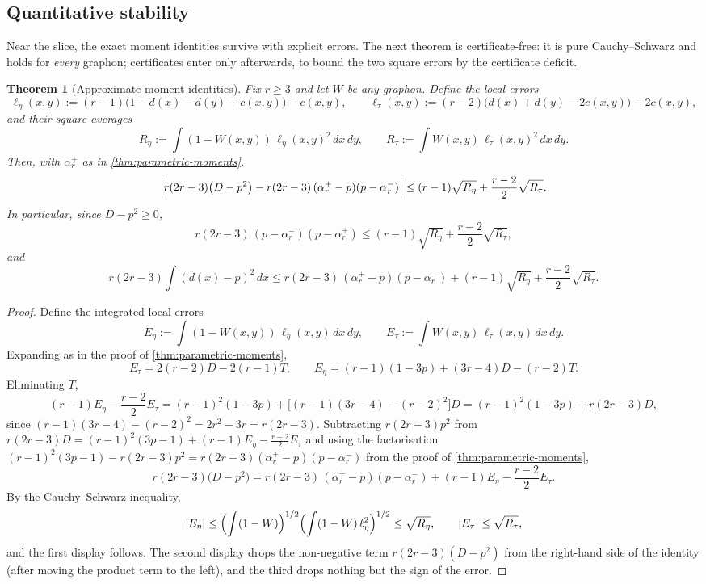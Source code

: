 \documentclass[11pt]{article}
\newtheorem{theorem}{Theorem}
\theoremstyle{definition}
\begin{document}
\subsection{Quantitative stability}

Near the slice, the exact moment identities survive with explicit errors.  The next
theorem is certificate-free: it is pure Cauchy--Schwarz and holds for \emph{every}
graphon; certificates enter only afterwards, to bound the two square errors by the
certificate deficit.

\begin{theorem}[Approximate moment identities]\label{thm:approximate-moments}
Fix $r\ge3$ and let $W$ be any graphon.  Define the local errors
\[
  \ell_\eta(x,y):=(r-1)\bigl(1-d(x)-d(y)+c(x,y)\bigr)-c(x,y),
  \qquad
  \ell_\tau(x,y):=(r-2)\bigl(d(x)+d(y)-2c(x,y)\bigr)-2c(x,y),
\]
and their square averages
\[
  R_\eta:=\int(1-W(x,y))\,\ell_\eta(x,y)^2\,dx\,dy,
  \qquad
  R_\tau:=\int W(x,y)\,\ell_\tau(x,y)^2\,dx\,dy .
\]
Then, with $\alpha_r^\pm$ as in \cref{thm:parametric-moments},
\[
  \Bigl|
  r(2r-3)\bigl(D-p^2\bigr)
  -
  r(2r-3)\,(\alpha_r^+-p)(p-\alpha_r^-)
  \Bigr|
  \le
  (r-1)\sqrt{R_\eta}+\frac{r-2}{2}\sqrt{R_\tau}.
\]
In particular, since $D-p^2\ge0$,
\[
  r(2r-3)\,(p-\alpha_r^-)(p-\alpha_r^+)
  \le
  (r-1)\sqrt{R_\eta}+\frac{r-2}{2}\sqrt{R_\tau},
\]
and
\[
  r(2r-3)\int(d(x)-p)^2\,dx
  \le
  r(2r-3)\,(\alpha_r^+-p)(p-\alpha_r^-)
  +
  (r-1)\sqrt{R_\eta}+\frac{r-2}{2}\sqrt{R_\tau}.
\]
\end{theorem}

\begin{proof}
Define the integrated local errors
\[
  E_\eta:=\int(1-W(x,y))\,\ell_\eta(x,y)\,dx\,dy,
  \qquad
  E_\tau:=\int W(x,y)\,\ell_\tau(x,y)\,dx\,dy .
\]
Expanding as in the proof of \cref{thm:parametric-moments},
\[
  E_\tau=2(r-2)D-2(r-1)T,
  \qquad
  E_\eta=(r-1)(1-3p)+(3r-4)D-(r-2)T .
\]
Eliminating $T$,
\[
  (r-1)E_\eta-\frac{r-2}{2}E_\tau
  =
  (r-1)^2(1-3p)+\bigl[(r-1)(3r-4)-(r-2)^2\bigr]D
  =
  (r-1)^2(1-3p)+r(2r-3)D,
\]
since $(r-1)(3r-4)-(r-2)^2=2r^2-3r=r(2r-3)$.  Subtracting $r(2r-3)p^2$ from
$r(2r-3)D=(r-1)^2(3p-1)+(r-1)E_\eta-\frac{r-2}{2}E_\tau$ and using the factorisation
$(r-1)^2(3p-1)-r(2r-3)p^2=r(2r-3)(\alpha_r^+-p)(p-\alpha_r^-)$ from the proof of
\cref{thm:parametric-moments},
\[
  r(2r-3)\bigl(D-p^2\bigr)
  =
  r(2r-3)\,(\alpha_r^+-p)(p-\alpha_r^-)
  +(r-1)E_\eta-\frac{r-2}{2}E_\tau .
\]
By the Cauchy--Schwarz inequality,
\[
  |E_\eta|
  \le
  \Bigl(\int(1-W)\Bigr)^{1/2}
  \Bigl(\int(1-W)\,\ell_\eta^2\Bigr)^{1/2}
  \le\sqrt{R_\eta},
  \qquad
  |E_\tau|\le\sqrt{R_\tau},
\]
and the first display follows.  The second display drops the non-negative term
$r(2r-3)(D-p^2)$ from the right-hand side of the identity (after moving the product term
to the left), and the third drops nothing but the sign of the error.
\end{proof}
\end{document}
